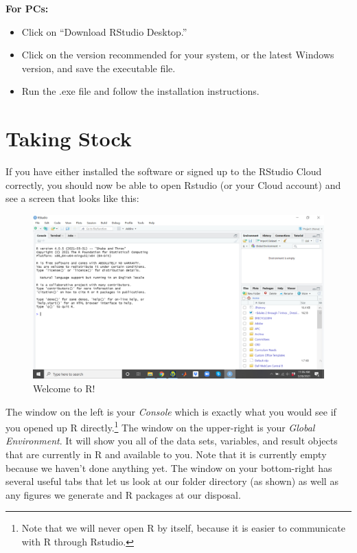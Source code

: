 \documentclass[
]{book}
\begin{document}
\textbf{For PCs:}

\begin{itemize}
\item
  Click on ``Download RStudio Desktop.''
\item
  Click on the version recommended for your system, or the latest Windows version, and save the executable file.
\item
  Run the .exe file and follow the installation instructions.
\end{itemize}

\hypertarget{taking-stock}{%
\section{Taking Stock}\label{taking-stock}}

If you have either installed the software or signed up to the RStudio Cloud correctly, you should now be able to open Rstudio (or your Cloud account) and see a screen that looks like this:

\begin{figure}

{\centering \includegraphics[width=0.75\linewidth]{images/Screenshot1} 

}

\caption{Welcome to R!}\label{fig:unnamed-chunk-29}
\end{figure}

The window on the left is your \emph{Console} which is exactly what you would see if you opened up R directly.\footnote{Note that we will never open R by itself, because it is easier to communicate with R through Rstudio.} The window on the upper-right is your \emph{Global Environment}. It will show you all of the data sets, variables, and result objects that are currently in R and available to you. Note that it is currently empty because we haven't done anything yet. The window on your bottom-right has several useful tabs that let us look at our folder directory (as shown) as well as any figures we generate and R packages at our disposal.
\end{document}
